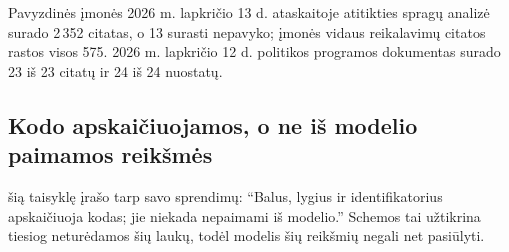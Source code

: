 Pavyzdinės įmonės 2026 m. lapkričio 13 d. ataskaitoje atitikties spragų analizė surado
2\,352 citatas, o 13 surasti nepavyko; įmonės vidaus reikalavimų citatos rastos visos 575.
2026 m. lapkričio 12 d. politikos programos dokumentas surado 23 iš 23 citatų ir 24 iš 24
nuostatų.

\subsection{Kodo apskaičiuojamos, o ne iš modelio paimamos reikšmės}\label{sec:control:computed}

 šią taisyklę įrašo tarp savo sprendimų: \enquote{Balus, lygius
ir identifikatorius apskaičiuoja kodas; jie niekada nepaimami iš modelio.} Schemos tai
užtikrina tiesiog neturėdamos šių laukų, todėl modelis šių reikšmių negali net pasiūlyti.

